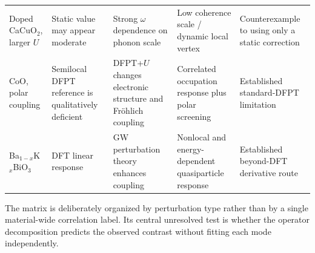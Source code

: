 \begin{longtable}{@{}p{2.4cm}p{2.55cm}p{2.25cm}p{2.45cm}p{3.2cm}@{}}
Doped CaCuO$_2$, larger $U$ & Static value may appear moderate & Strong
$\omega$ dependence on phonon scale & Low coherence scale / dynamic local vertex &
Counterexample to using only a static correction \citep{Abramovitch2025} \\

CoO, polar coupling & Semilocal DFPT reference is qualitatively deficient &
DFPT+$U$ changes electronic structure and Fr\"ohlich coupling & Correlated
occupation response plus polar screening & Established standard-DFPT limitation
\citep{Zhou2021} \\

Ba$_{1-x}$K$_x$BiO$_3$ & DFT linear response & GW perturbation theory enhances
coupling & Nonlocal and energy-dependent quasiparticle response & Established
beyond-DFT derivative route \citep{Li2019} \\
\end{longtable}
\normalsize

The matrix is deliberately organized by perturbation type rather than by a single
material-wide correlation label.  Its central unresolved test is whether the
operator decomposition predicts the observed contrast without fitting each mode
independently.
